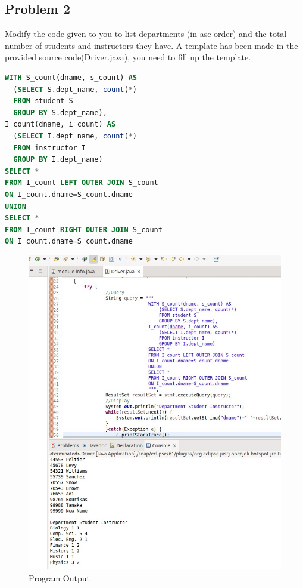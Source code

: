 \documentclass{article}
\begin{document}
\subsection{Problem 2}
Modify the code given to you to list departments (in asc order) and the total number of
students and instructors they have. A template has been made in the provided source
code(Driver.java), you need to fill up the template.
\begin{lstlisting}[language=sql]
WITH S_count(dname, s_count) AS
  (SELECT S.dept_name, count(*)
  FROM student S
  GROUP BY S.dept_name),
I_count(dname, i_count) AS
  (SELECT I.dept_name, count(*)
  FROM instructor I
  GROUP BY I.dept_name)
SELECT *
FROM I_count LEFT OUTER JOIN S_count
ON I_count.dname=S_count.dname
UNION
SELECT *
FROM I_count RIGHT OUTER JOIN S_count
ON I_count.dname=S_count.dname
\end{lstlisting}
\begin{figure}[!ht]
  \begin{center}
  \includegraphics[scale=0.5]{Part_A_2.jpg}
  \caption{Program Output}
  \end{center}
\end{figure}
\end{document}
